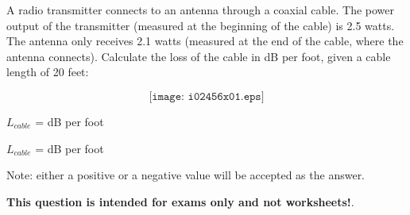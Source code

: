 

A radio transmitter connects to an antenna through a coaxial cable.  The power output of the transmitter (measured at the beginning of the cable) is 2.5 watts.  The antenna only receives 2.1 watts (measured at the end of the cable, where the antenna connects).  Calculate the loss of the cable in dB per foot, given a cable length of 20 feet:

$$\texttt{[image: i02456x01.eps]}$$

$L_{cable}$ = \underbar{\hskip 50pt} dB per foot







$L_{cable}$ =  dB per foot

\vskip 10pt

Note: either a positive or a negative value will be accepted as the answer.







{\bf This question is intended for exams only and not worksheets!}.



